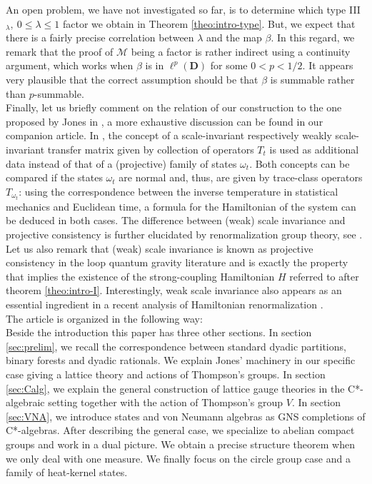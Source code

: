 \documentclass[a4paper,12pt]{amsart}
\numberwithin{equation}{section}
\theoremstyle{definition}
\newcommand{\D}{\mathbf D}
\newcommand{\scrM}{\mathscr M}
\begin{document}
An open problem, we have not investigated so far, is to determine which type III$_\lambda, \ 0\leq \lambda\leq 1$ factor we obtain in Theorem \ref{theo:intro-type}. 
But, we expect that there is a fairly precise correlation between $\lambda$ and the map $\beta$.
In this regard, we remark that the proof of $\scrM$ being a factor is rather indirect using a continuity argument, which works when $\beta$ is in $\ell^p(\D)$ for some $0<p<1/2.$
It appears very plausible that the correct assumption should be that $\beta$ is summable rather than $p$-summable.\\[0.1cm]
Finally, let us briefly comment on the relation of our construction to the one proposed by Jones in \cite{Jones18-Hamiltonian}, a more exhaustive discussion can be found in our companion article. In \cite{Jones18-Hamiltonian}, the concept of a scale-invariant respectively weakly scale-invariant transfer matrix given by collection of operators $T_t$ is used as additional data instead of that of a (projective) family of states $\omega_t$. Both concepts can be compared if the states $\omega_{t}$ are normal and, thus, are given by trace-class operators $T_{\omega_{t}}$: using the correspondence between the inverse temperature in statistical mechanics and Euclidean time, a formula for the Hamiltonian of the system can be deduced in both cases. The difference between (weak) scale invariance and projective consistency is further elucidated by renormalization group theory, see {\cite[Section 4]{Brot-Stottmeister-Phys}}. Let us also remark that (weak) scale invariance is known as projective consistency in the loop quantum gravity literature \cite{Thiemann-07-QuantumGR} and is exactly the property that implies the existence of the strong-coupling Hamiltonian $H$ referred to after theorem \ref{theo:intro-I}. 
Interestingly, weak scale invariance also appears as an essential ingredient in a recent analysis of Hamiltonian renormalization \cite{Lang-Liegener-Thiemann17}.\\[0.1cm] 
The article is organized in the following way:\\[0.1cm]
Beside the introduction this paper has three other sections.
In section \ref{sec:prelim}, we recall the correspondence between standard dyadic partitions, binary forests and dyadic rationals.
We explain Jones' machinery in our specific case giving a lattice theory and actions of Thompson's groups. 
In section \ref{sec:Calg}, we explain the general construction of lattice gauge theories in the C*-algebraic setting together with the action of Thompson's group $V$.
In section \ref{sec:VNA}, we introduce states and von Neumann algebras as GNS completions of C*-algebras.
After describing the general case, we specialize to abelian compact groups and work in a dual picture.
We obtain a precise structure theorem when we only deal with one measure.
We finally focus on the circle group case and a family of heat-kernel states.
\end{document}
